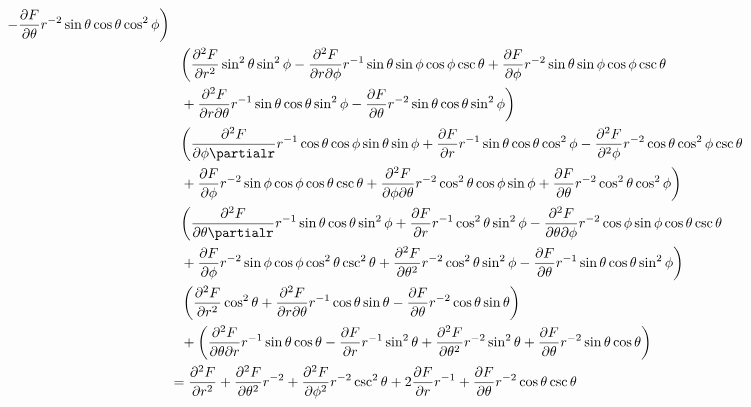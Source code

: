 \documentclass[12pt]{article}
\begin{document}
\begin{gather*}
\begin{aligned}
			-\frac{\partial F} {\partial \theta} r^{-2}\sin\theta\cos\theta\cos^2\phi 
			\biggl) \\
		&\phantom{=} \biggl( 
				\frac{\partial^2 F} {\partial r^2} \sin^2\theta\sin^2\phi
				- \frac{\partial^2 F} {\partial r \partial\phi}
					r^{-1}\sin\theta\sin\phi\cos\phi\csc\theta 
				+ \frac{\partial F} {\partial \phi}
					r^{-2}\sin\theta\sin\phi\cos\phi\csc\theta \\
				&\phantom{=} + \frac{\partial^2 F} {\partial r\partial \theta}
					r^{-1}\sin\theta\cos\theta\sin^2\phi
				- \frac{\partial F} {\partial \theta}
					r^{-2}\sin\theta\cos\theta\sin^2\phi
			\biggl) \\
		&\phantom{=} 
			\biggl( 
				\frac{\partial^2 F} {\partial\phi\partialr}
					r^{-1}\cos\theta\cos\phi\sin\theta\sin\phi
				+ \frac{\partial F} {\partial r} r^{-1}\sin\theta\cos\theta\cos^2\phi
				- \frac{\partial^2 F} {\partial^2 \phi}
					r^{-2}\cos\theta\cos^2\phi\csc\theta \\
				&\phantom{=} + \frac{\partial F} {\partial \phi}
					r^{-2}\sin\phi\cos\phi\cos\theta\csc\theta 
				+ \frac{\partial^2 F} {\partial\phi\partial\theta}
					r^{-2}\cos^2\theta\cos\phi\sin\phi
				+ \frac{\partial F} {\partial \theta} r^{-2}\cos^2\theta\cos^2\phi
			\biggl) \\
		&\phantom{=}
			\biggl( 
				\frac{\partial^2 F} {\partial\theta\partialr}
					r^{-1}\sin\theta\cos\theta\sin^2\phi
				+\frac{\partial F} {\partial r} r^{-1}\cos^2\theta\sin^2\phi
				- \frac{\partial^2 F} {\partial\theta\partial\phi}
					r^{-2}\cos\phi\sin\phi\cos\theta\csc\theta \\
				&\phantom{=} + \frac{\partial F} {\partial \phi}
					r^{-2}\sin\phi\cos\phi\cos^2\theta\csc^2\theta 
				+ \frac{\partial^2 F} {\partial\theta^2} r^{-2}\cos^2\theta\sin^2\phi
				- \frac{\partial F} {\partial \theta}
					r^{-1}\sin\theta\cos\theta\sin^2\phi
			\biggl) \\
		&\phantom{=} \left( 
				\frac{\partial^2F} {\partial r^2} \cos^2\theta
				+ \frac{\partial^2F} {\partial r\partial\theta}
					r^{-1}\cos\theta\sin\theta
				- \frac{\partial F} {\partial \theta} r^{-2}\cos\theta\sin\theta
			\right) \\
			&\phantom{=} + \left( 
				\frac{\partial^2F} {\partial\theta\partial r}
					r^{-1}\sin\theta\cos\theta
				- \frac{\partial F} {\partial r} r^{-1}\sin^2\theta
				+ \frac{\partial^2F} {\partial \theta^2} r^{-2}\sin^2\theta
				+ \frac{\partial F} {\partial \theta} r^{-2}\sin\theta\cos\theta
			\right) \\
		&= \frac{\partial^2 F}{\partial r^2} + \frac{\partial^2 F}{\partial\theta^2}
			r^{-2} + \frac{\partial^2 F}{\partial\phi^2} r^{-2}\csc^2\theta
			+ 2\frac{\partial F}{\partial r} r^{-1} + \frac{\partial F}
			{\partial\theta} r^{-2} \cos\theta\csc\theta
	\end{aligned}
\end{gather*}
\filbreak
\end{document}
